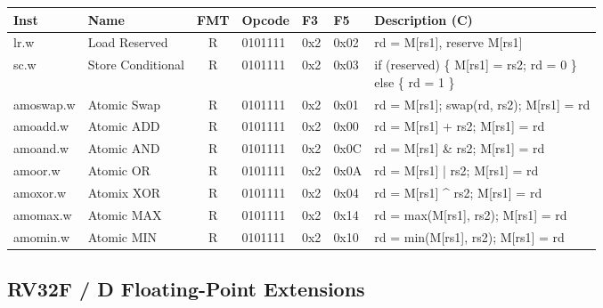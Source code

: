 \begin{center}
\begin{tabular}
{T | l | c | T | T | T | T } \hline
\rm Inst  & Name              & FMT   & \rm Opcode & \rm F3 & \rm F5 & \rm Description (C)         \\ \hline
lr.w      & Load Reserved     & R     & 0101111    & 0x2    & 0x02   & rd = M[rs1], reserve M[rs1] \\
sc.w      & Store Conditional & R     & 0101111    & 0x2    & 0x03   & \parbox[t]{2.5in}{ if (reserved) \{ M[rs1] = rs2; rd = 0 \} \\
                                                                        else \{ rd = 1 \}}   \\
amoswap.w & Atomic Swap       & R     & 0101111    & 0x2    & 0x01   & rd = M[rs1]; swap(rd, rs2); M[rs1] = rd \\
amoadd.w  & Atomic ADD        & R     & 0101111    & 0x2    & 0x00   & rd = M[rs1] + rs2; M[rs1] = rd \\
amoand.w  & Atomic AND        & R     & 0101111    & 0x2    & 0x0C   & rd = M[rs1] \& rs2; M[rs1] = rd \\
amoor.w   & Atomic OR         & R     & 0101111    & 0x2    & 0x0A   & rd = M[rs1] | rs2; M[rs1] = rd \\
amoxor.w  & Atomix XOR        & R     & 0101111    & 0x2    & 0x04   & rd = M[rs1] \^{} rs2; M[rs1] = rd \\
amomax.w  & Atomic MAX        & R     & 0101111    & 0x2    & 0x14   & rd = max(M[rs1], rs2); M[rs1] = rd \\
amomin.w  & Atomic MIN        & R     & 0101111    & 0x2    & 0x10   & rd = min(M[rs1], rs2); M[rs1] = rd \\
\hline
\end{tabular}
\end{center}

\subsection*{RV32F / D Floating-Point Extensions}

